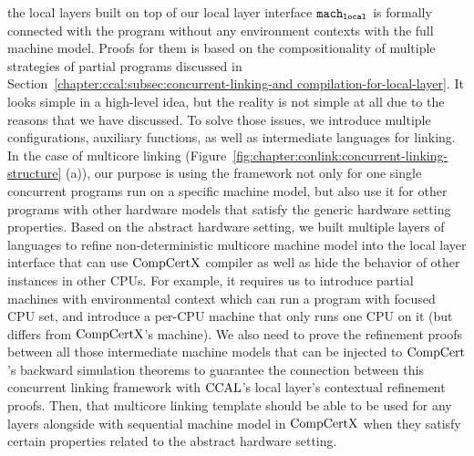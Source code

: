 the local layers built on top of our local layer interface ${\mathrm{\texttt{mach}}}_{{\mathrm{\texttt{local}}}}$ is 
formally connected with the program without any environment contexts with the full machine model. 
Proofs for them is based on the compositionality of multiple strategies 
of partial programs discussed in Section~\ref{chapter:ccal:subsec:concurrent-linking-and compilation-for-local-layer}.   
It looks simple in a high-level idea, but the reality is not simple at all
due to the reasons that we have discussed.  
To solve those issues, 
we introduce multiple configurations, auxiliary functions, as well as intermediate languages for linking. 
In the case of multicore linking (Figure~\ref{fig:chapter:conlink:concurrent-linking-structure} (a)),
our purpose is using the framework not only for one single concurrent programs run on a specific machine model, 
but also use it for other programs with other hardware models that satisfy the generic hardware setting properties. 
Based on the abstract hardware setting, 
we built multiple layers of languages to refine non-deterministic multicore machine model 
into the local layer interface that can use $\mathrm{CompCertX}$ compiler as well as 
hide the behavior of other instances in other CPUs.
For example, 
it requires us to introduce partial machines with environmental context which can run a program with focused CPU set, 
and introduce a per-CPU machine that only runs one CPU on it (but differs from $\mathrm{CompCertX}$'s machine). 
We also need to prove the refinement proofs between all those intermediate machine models
that can be injected to $\mathrm{CompCert}$'s backward simulation theorems to guarantee the connection between this concurrent linking framework with $\mathrm{CCAL}$'s local layer's contextual refinement proofs. 
Then, that multicore linking template should be able to be used for any layers alongside with sequential machine model in $\mathrm{CompCertX}$ when they satisfy certain properties related to the abstract hardware setting. 

